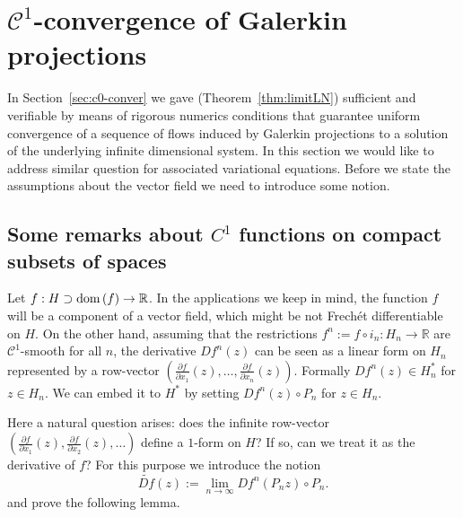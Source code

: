 
\section{$\mathcal C^1$-convergence of Galerkin projections}
\label{sec:c1-conver}

In Section~\ref{sec:c0-conver} we gave (Theorem~\ref{thm:limitLN}) sufficient and verifiable by means of rigorous numerics conditions that guarantee uniform convergence of a sequence of flows induced by Galerkin projections to a solution of the underlying infinite dimensional system. In this section we would like to address similar question for associated variational equations. Before we state the assumptions about the vector field we need to introduce some notion.


\subsection{Some remarks about $C^1$ functions on compact subsets of \gss spaces}

Let $f:H \supset {\rm dom}\, (f) \to \mathbb{R}$. In the applications we keep in mind, the function $f$ will be a component of a vector field, which might be not  Frech\'et differentiable on $H$. On the other hand, assuming that the restrictions $f^n:=f\circ i_n: H_n \to \mathbb{R}$ are $\mathcal C^1$-smooth for all $n$, the derivative $Df^n(z)$ can be seen as a linear form on $H_n$ represented by a row-vector   $\left(\frac{\partial f}{\partial x_1}(z),\dots,  \frac{\partial f}{\partial x_n}(z)\right)$. Formally $Df^n(z) \in H_n^*$ for $z \in H_n$. We can embed it to $H^*$ by setting $Df^n(z) \circ P_n $ for $z \in H_n$.

Here a natural question arises: does the infinite row-vector  \newline $\left(\frac{\partial f}{\partial x_1}(z), \frac{\partial f}{\partial x_2}(z),\dots\right)$ define a $1$-form on $H$? If so, can we treat it as the derivative of $f$? For this purpose we introduce the notion
\begin{equation}\label{eq:rowderivative}
	\widetilde{D f}(z) := \lim_{n \to \infty} Df^n(P_n z) \circ P_n.
\end{equation}
and prove the following lemma.

